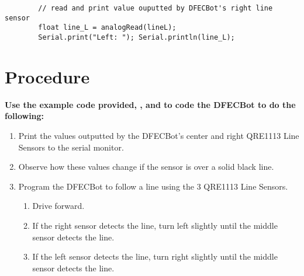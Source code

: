 \documentclass{handout}
\begin{document}
	\begin{lstlisting}
		// read and print value ouputted by DFECBot's right line sensor
		float line_L = analogRead(lineL);
		Serial.print("Left: "); Serial.println(line_L);
	\end{lstlisting}
	
	\newpage
	\clearpage
	\pagebreak
	
	\section{Procedure}
	\textbf{Use the example code provided, , and  to code the DFECBot to do the following:}
		
	\begin{enumerate}
		\item Print the values outputted by the DFECBot's center and right QRE1113 Line Sensors to the serial monitor.
		\item Observe how these values change if the sensor is over a solid black line.
		\item Program the DFECBot to follow a line using the 3 QRE1113 Line Sensors.
			\begin{enumerate}
				\item Drive forward.
				\item If the right sensor detects the line, turn left slightly until the middle sensor detects the line.
				\item If the left sensor detects the line, turn right slightly until the middle sensor detects the line.
			\end{enumerate}
	\end{enumerate} 	
\end{document}

